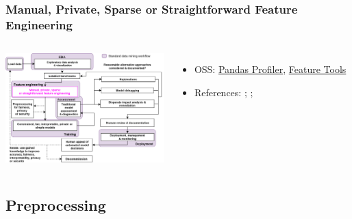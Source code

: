 \documentclass[11pt,
               aspectratio=169,
               hyperref={colorlinks}
               ]{beamer}
\begin{document}
			\begin{frame}
		
				\frametitle{Manual, Private, Sparse or Straightforward Feature Engineering }		
		
				\begin{columns}
	
					\centering
					\includegraphics[height=120pt]{img/fe.png}
				
					\vspace{-5pt}
					\begin{itemize}
						\item OSS: \href{https://github.com/pandas-profiling/pandas-profiling}{Pandas Profiler}, \href{https://index.pocketcluster.io/featuretools-featuretools.html}{Feature Tools}
						\item References: ; ; 
					\end{itemize}
				
				\end{columns}		
		
			\end{frame}
	
		\subsection{Preprocessing}
	
\end{document}
